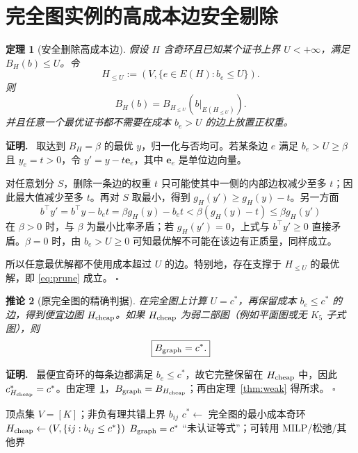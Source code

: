 \documentclass[11pt,a4paper]{ctexart}
\newtheorem{theorem}{定理}[section]
\newtheorem{corollary}[theorem]{推论}
\theoremstyle{definition}
\newenvironment{proofcn}{\par\noindent\textbf{证明.}\ }{\hfill$\square$\par}
\newcommand{\1}{\boldsymbol 1}
\begin{document}
\section{完全图实例的高成本边安全剔除}
\begin{theorem}[安全删除高成本边]\label{thm:prune}
假设 $H$ 含奇环且已知某个证书上界 $U<+\infty$，满足 $B_H(b)\le U$。令
\[
 H_{\le U}:=(V,\{e\in E(H):b_e\le U\}).
\]
则
\begin{equation}\label{eq:prune}
 \boxed{B_H(b)=B_{H_{\le U}}(b|_{E(H_{\le U})}).}
\end{equation}
并且任意一个最优证书都不需要在成本 $b_e>U$ 的边上放置正权重。
\end{theorem}
\begin{proofcn}
取达到 $B_H=\beta$ 的最优 $y$，归一化与否均可。若某条边 $e$ 满足 $b_e>U\ge\beta$ 且 $y_e=t>0$，令 $y'=y-t\mathbf e_e$，其中 $\mathbf e_e$ 是单位边向量。

对任意划分 $S$，删除一条边的权重 $t$ 只可能使其中一侧的内部边权减少至多 $t$；因此最大值减少至多 $t$。再对 $S$ 取最小，得到 $g_H(y')\ge g_H(y)-t$。另一方面
\[
 b^\top y'=b^\top y-b_et=\beta g_H(y)-b_et
 <\beta(g_H(y)-t)\le\beta g_H(y')
\]
在 $\beta>0$ 时，与 $\beta$ 为最小比率矛盾；若 $g_H(y')=0$，上式与 $b^\top y'\ge0$ 直接矛盾。$\beta=0$ 时，由 $b_e>U\ge0$ 可知最优解不可能在该边有正质量，同样成立。

所以任意最优解都不使用成本超过 $U$ 的边。特别地，存在支撑于 $H_{\le U}$ 的最优解，即 \eqref{eq:prune} 成立。
\end{proofcn}

\begin{corollary}[原完全图的精确判据]\label{cor:cheap}
在完全图上计算 $U=c^*$，再保留成本 $b_e\le c^*$ 的边，得到便宜边图 $H_{\rm cheap}$。如果 $H_{\rm cheap}$ 为弱二部图（例如平面图或无 $K_5$ 子式图），则
\begin{equation}\label{eq:cheap}
 \boxed{B_{\rm graph}=c^*.}
\end{equation}
\end{corollary}
\begin{proofcn}
最便宜奇环的每条边都满足 $b_e\le c^*$，故它完整保留在 $H_{\rm cheap}$ 中，因此 $c^*_{H_{\rm cheap}}=c^*$。由定理~\ref{thm:prune}，$B_{\rm graph}=B_{H_{\rm cheap}}$；再由定理~\ref{thm:weak} 得所求。
\end{proofcn}

\begin{algorithm}[htbp]
\caption{完全图上的奇环证书精确性检测（充分条件）}\label{alg:prune}
\begin{algorithmic}[1]
\Require 顶点集 $V=[K]$；非负有理共错上界 $b_{ij}$
\State $c^*\gets$ 完全图的最小成本奇环
\State $H_{\rm cheap}\gets(V,\{ij:b_{ij}\le c^*\})$
    \State \Return $B_{\rm graph}=c^*$ 
\Else
    \State \Return ``未认证等式''；可转用 MILP/松弛/其他界
\EndIf
\end{algorithmic}
\end{algorithm}
\end{document}
